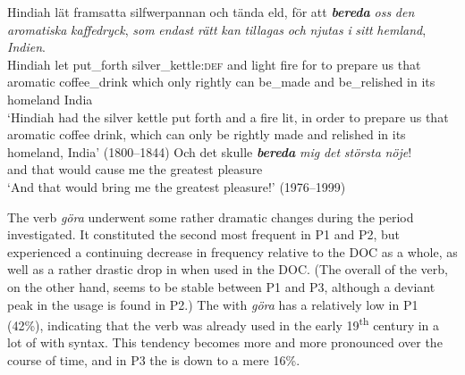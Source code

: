 \documentclass[output=paper]{langscibook}
\begin{document}
\ea \label{ex:valdeson:8}
\gll Hindiah lät framsatta silfwerpannan   och tända eld, för att \textbf{\textit{bereda}} \textit{oss}  \textit{den} \textit{aromatiska}    \textit{kaffedryck},   \textit{som}  \textit{endast}  \textit{rätt}    \textit{kan}  \textit{tillagas} \textit{och}  \textit{njutas}      \textit{i}    \textit{sitt}  \textit{hemland},  \textit{Indien}. \\
   Hindiah let put\_forth  silver\_kettle:\textsc{def}     and light  fire for to prepare us    that  aromatic       coffee\_drink  which  only    rightly  can   be\_made and  be\_relished    in    its    homeland     India\\
\glt ‘Hindiah had the silver kettle put forth and a fire lit, in order to prepare us that aromatic coffee drink, which can only be rightly made and relished in its homeland, India’ (1800–1844)
\ex \label{ex:valdeson:9}
\gll Och  det    skulle \textbf{\textit{bereda}} \textit{mig}  \textit{det}  \textit{största}    \textit{nöje}!\\
  and      that      would  cause      me    the  greatest  pleasure\\
\glt `And that would bring me the greatest pleasure!’ (1976–1999)
\z


\label{sec:valdeson:5.3.1.2}



The verb \textit{göra} underwent some rather dramatic changes during the period investigated. It constituted the second most frequent  in P1 and P2, but experienced a continuing decrease in frequency relative to the DOC as a whole, as well as a rather drastic drop in  when used in the DOC. (The overall  of the verb, on the other hand, seems to be stable between P1 and P3, although a deviant peak in the usage is found in P2.) The  with \textit{göra} has a relatively low  in P1 (42\%), indicating that the verb was already used in the early 19\textsuperscript{th} century in a lot of  with  syntax. This tendency becomes more and more pronounced over the course of time, and in P3 the  is down to a mere 16\%.
\end{document}
